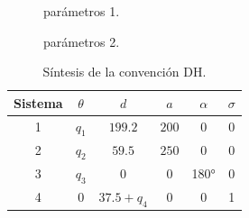 \documentclass[a4paper,12pt]{article}
\begin{document}
\begin{figure}[H]
    \centering
    \begin{adjustbox}{scale = 0.66, max width=\columnwidth}
    \end{adjustbox}
    \caption{parámetros 1.}
\end{figure}

\begin{figure}[H]
    \centering
    \begin{adjustbox}{scale = 0.66, max width=\columnwidth}
    \end{adjustbox}
    \caption{parámetros 2.}
    \label{rango lineal scara}
\end{figure}

\begin{table}[H]
    \centering
    \begin{tabular}{|c|c|c|c|c|c|}
    \hline
    Sistema & $\theta$  & $d$           & $a$    & $\alpha$ & $\sigma$ \\ \hline
    1       & $q_1$     & $199.2$       & $200$  & 0        & 0        \\ \hline
    2       & $q_2$     & $59.5$        & $250$  & 0        & 0        \\ \hline
    3       & $q_3$     & $0$           & $0$    & 180°      & 0        \\ \hline
    4       & $0$       & $37.5 + q_4$  & $0$    & 0        & 1        \\ \hline
    \end{tabular}
    \caption{Síntesis de la convención DH.}
    \label{sintesis_DH_scara}
\end{table}
\end{document}
